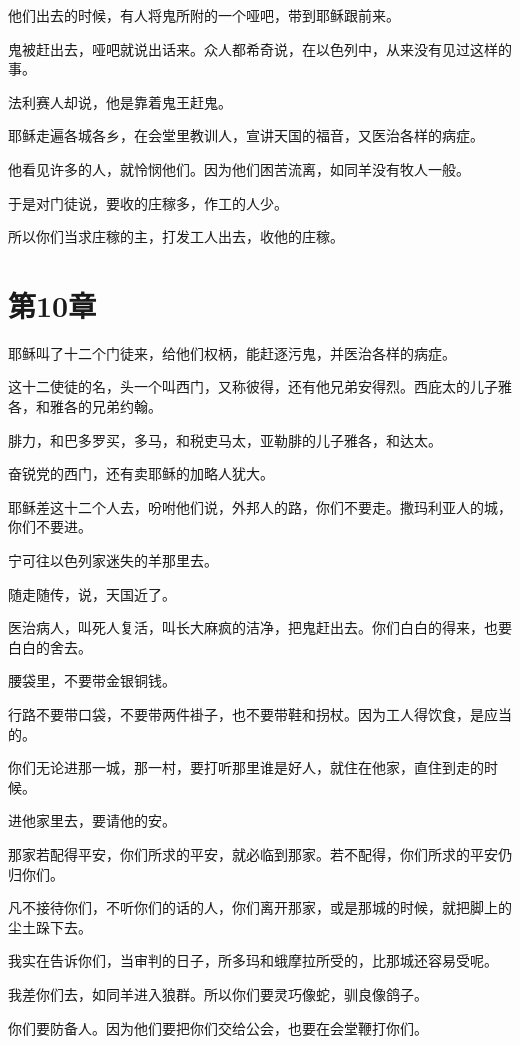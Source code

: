\documentclass[12pt,oneside]{book}
\begin{document}
他们出去的时候，有人将鬼所附的一个哑吧，带到耶稣跟前来。

鬼被赶出去，哑吧就说出话来。众人都希奇说，在以色列中，从来没有见过这样的事。

法利赛人却说，他是靠着鬼王赶鬼。

耶稣走遍各城各乡，在会堂里教训人，宣讲天国的福音，又医治各样的病症。

他看见许多的人，就怜悯他们。因为他们困苦流离，如同羊没有牧人一般。

于是对门徒说，要收的庄稼多，作工的人少。

所以你们当求庄稼的主，打发工人出去，收他的庄稼。

\chapter{第10章}
耶稣叫了十二个门徒来，给他们权柄，能赶逐污鬼，并医治各样的病症。

这十二使徒的名，头一个叫西门，又称彼得，还有他兄弟安得烈。西庇太的儿子雅各，和雅各的兄弟约翰。

腓力，和巴多罗买，多马，和税吏马太，亚勒腓的儿子雅各，和达太。

奋锐党的西门，还有卖耶稣的加略人犹大。

耶稣差这十二个人去，吩咐他们说，外邦人的路，你们不要走。撒玛利亚人的城，你们不要进。

宁可往以色列家迷失的羊那里去。

随走随传，说，天国近了。

医治病人，叫死人复活，叫长大麻疯的洁净，把鬼赶出去。你们白白的得来，也要白白的舍去。

腰袋里，不要带金银铜钱。

行路不要带口袋，不要带两件褂子，也不要带鞋和拐杖。因为工人得饮食，是应当的。

你们无论进那一城，那一村，要打听那里谁是好人，就住在他家，直住到走的时候。

进他家里去，要请他的安。

那家若配得平安，你们所求的平安，就必临到那家。若不配得，你们所求的平安仍归你们。

凡不接待你们，不听你们的话的人，你们离开那家，或是那城的时候，就把脚上的尘土跺下去。

我实在告诉你们，当审判的日子，所多玛和蛾摩拉所受的，比那城还容易受呢。

我差你们去，如同羊进入狼群。所以你们要灵巧像蛇，驯良像鸽子。

你们要防备人。因为他们要把你们交给公会，也要在会堂鞭打你们。
\end{document}
